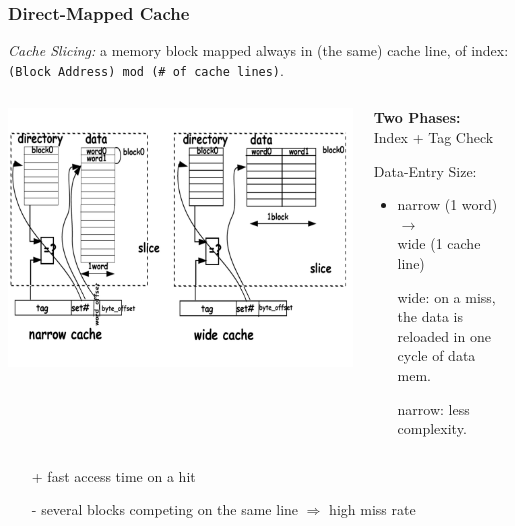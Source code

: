 \documentclass{beamer}
\renewcommand{\emph}[1]{\textcolor{structure}{#1}}
\newcommand{\emp}[1]{\textcolor{DikuRed}{ #1}}
\begin{document}
\begin{frame}[fragile,t]
\frametitle{Direct-Mapped Cache}
 
{\em Cache Slicing:} a memory block mapped always in (the same) cache line, of index:
{\tt (Block Address) mod (\# of cache lines)}.\bigskip
\vspace{-3ex}
\begin{columns}
\includegraphics[width=44ex]{FigsMemH/CacheWide}
\begin{scriptsize}
{\bf Two Phases:}\\
\emp{Index} + \emph{Tag Check}
\bigskip

\emp{Data-Entry Size:}\\ 
\begin{itemize}
    \item narrow (1 word) $\rightarrow$\\wide (1 cache line)
    \item[wide:] on a miss, the data is reloaded in one cycle of data mem.
    \item[narrow:] less complexity.
\end{itemize} 
\end  {scriptsize}
\end{columns}

\begin{itemize}
    \item[\emph{+}]  fast access time on a hit
    \item[\alert{-}] several blocks competing on the same line $\Rightarrow$ high miss rate 
\end  {itemize}

\end{frame}
\end{document}

